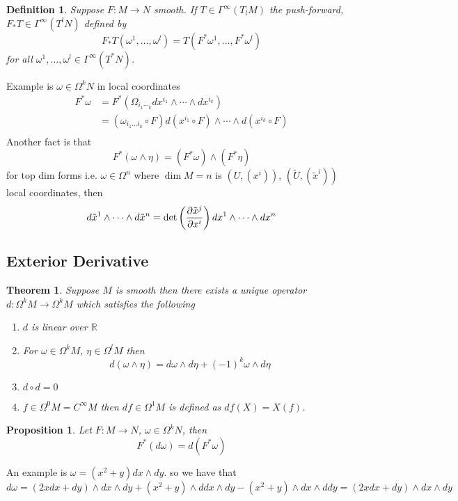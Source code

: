 \documentclass[a4paper]{article}
\newtheorem*{prop}{Proposition}
\newtheorem*{defn}{Definition}
\newtheorem*{thm}{Theorem}
\begin{document}
\begin{defn}
  Suppose $F: M \rightarrow N$ smooth. If $T \in \Gamma^\infty(T_lM)$ the push-forward, $F_* T \in \Gamma^\infty(T^lN)$ defined by 
  \[
    F_*T(\omega^1, \dots, \omega^l) = T(F^*\omega^1, \dots, F^*\omega^l)
  \]
  for all $\omega^1, \dots, \omega^l \in \Gamma^\infty(T^*N)$.
\end{defn}
Example is $\omega \in \Omega^kN$ in local coordinates
\[
  \begin{aligned}
    F^*\omega &= F^*(\Omega_{i_1\dotsi_k} dx^{i_1} \wedge \cdots \wedge dx^{i_k}) \\
              &= (\omega_{i_1 \dots i_k} \circ F) d(x^{i_1} \circ F) \wedge \cdots \wedge d(x^{i_k} \circ F) \\
  \end{aligned}
\]
Another fact is that
\[
  F^*(\omega \wedge \eta) = (F^*\omega) \wedge (F^*\eta)
\]
for top dim forms i.e. $\omega \in \Omega^n$ where $\dim M = n$ is $(U, (x^i))$, $(\tilde{U}, (\tilde{x}^i))$ local coordinates, then
\[
  d\tilde{x}^1 \wedge \dots \wedge d\tilde{x}^n = \det\left( \pdv{\tilde{x}^j}{x^i}\right) dx^1 \wedge \cdots \wedge dx^n
\]

\subsection*{Exterior Derivative}%

\begin{thm}
  Suppose $M$ is smooth then there exists a unique operator $d: \Omega^kM \rightarrow \Omega^{k}M$ which satisfies the following 
  \begin{enumerate}
    \item $d$ is linear over $\mathds{R}$
    \item For $\omega \in \Omega^kM$, $\eta \in \Omega^lM$ then
      \[
        d(\omega \wedge \eta) = d\omega \wedge d\eta + (-1)^k \omega \wedge d\eta
      \]
    \item $d \circ d = 0$
    \item $f \in \Omega^0M = C^\infty M$ then $df \in \Omega^1M$ is defined as $df(X) = X(f)$.
  \end{enumerate}
\end{thm}

\begin{prop}
 Let $F: M \rightarrow N$, $\omega \in \Omega^kN$, then 
 \[
   F^*(d\omega) = d(F^*\omega)
 \]
\end{prop}

An example is $\omega = (x^2 + y) dx \wedge dy$. so we have that
\[
  d\omega = (2x dx + dy) \wedge dx \wedge dy + (x^2 + y) \wedge ddx \wedge dy - (x^2 + y) \wedge dx \wedge ddy = (2x dx + dy) \wedge dx \wedge dy
\]
\end{document}
